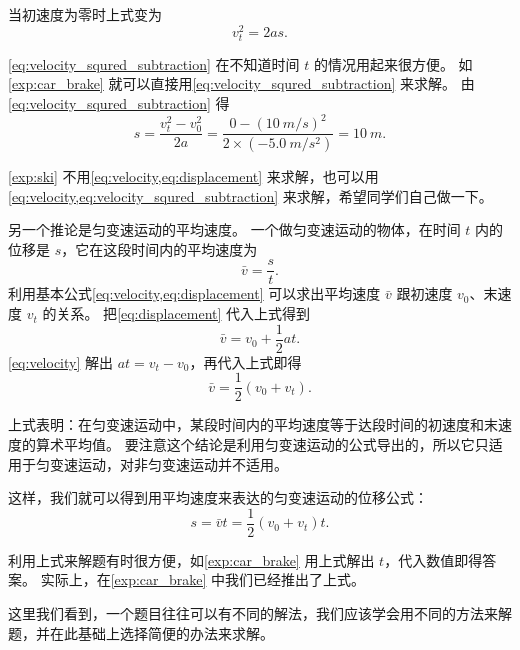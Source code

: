 当初速度为零时上式变为
\begin{equation}
v^2_t=2as.
\end{equation}

\cref{eq:velocity_squred_subtraction} 在不知道时间 $t$ 的情况用起来很方便。
如\cref{exp:car_brake} 就可以直接用\cref{eq:velocity_squred_subtraction} 来求解。
由\cref{eq:velocity_squred_subtraction} 得
\[s=\frac{v^2_t-v^2_0}{2a}=\frac{0-(\qty{10}{m/s})^2}{2\times ( \qty{-5.0}{m/s^2} )}=\qty{10}{m}.\]

\cref{exp:ski} 不用\cref{eq:velocity,eq:displacement} 来求解，也可以用\cref{eq:velocity,eq:velocity_squred_subtraction} 来求解，希望同学们自己做一下。

另一个推论是匀变速运动的平均速度。
一个做匀变速运动的物体，在时间 $t$ 内的位移是 $s$，它在这段时间内的平均速度为
\[\bar v=\frac{s}{t}.\]
利用基本公式\cref{eq:velocity,eq:displacement} 可以求出平均速度 $\bar v$ 跟初速度 $v_0$、末速度 $v_t$ 的关系。
把\cref{eq:displacement} 代入上式得到
\[\bar v=v_0+\frac{1}{2}at.\]
\cref{eq:velocity} 解出 $at=v_t-v_0$，再代入上式即得
\begin{equation}
\bar v=\frac{1}{2}(v_0+v_t).
\end{equation}

上式表明：在匀变速运动中，某段时间内的平均速度等于达段时间的初速度和末速度的算术平均值。
要注意这个结论是利用匀变速运动的公式导出的，所以它只适用于匀变速运动，对非匀变速运动并不适用。

这样，我们就可以得到用平均速度来表达的匀变速运动的位移公式：
\[s=\bar v t=\frac{1}{2} (v_0+v_t)t.\]

利用上式来解题有时很方便，如\cref{exp:car_brake} 用上式解出 $t$，代入数值即得答案。
实际上，在\cref{exp:car_brake} 中我们已经推出了上式。

这里我们看到，一个题目往往可以有不同的解法，我们应该学会用不同的方法来解题，并在此基础上选择简便的办法来求解。

